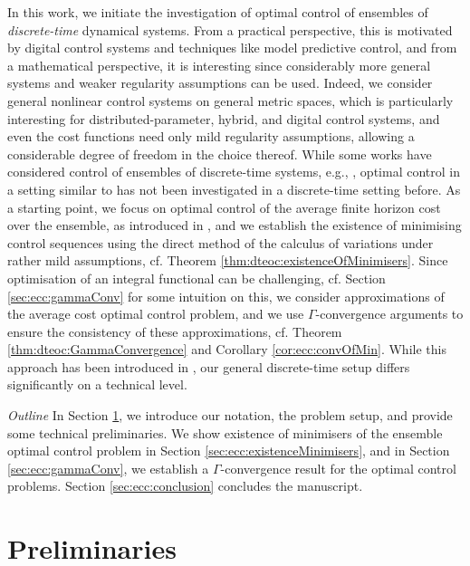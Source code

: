 \documentclass[letterpaper, 10 pt, conference]{IEEEconf}  %
\theoremstyle{theorem}
\theoremstyle{definition}
\theoremstyle{remark}
\begin{document}
In this work, we initiate the investigation of optimal control of ensembles of \emph{discrete-time} dynamical systems.
From a practical perspective, this is motivated by digital control systems and techniques like model predictive control,
and from a mathematical perspective, it is interesting since considerably more general systems and weaker regularity assumptions can be used.
Indeed, we consider general nonlinear control systems on general metric spaces, which is particularly interesting for distributed-parameter, hybrid, and digital control systems, and even the cost functions need only mild regularity assumptions, allowing a considerable degree of freedom in the choice thereof.
While some works have considered control of ensembles of discrete-time systems, e.g., \cite{tie2016controllability}, optimal control in a setting similar to \cite{scagliotti2023optimal} has not been investigated in a discrete-time setting before.
As a starting point, we focus on optimal control of the average finite horizon cost over the ensemble, as introduced in \cite{scagliotti2023optimal},
and we establish the existence of minimising control sequences using the direct method of the calculus of variations under rather mild assumptions, cf. Theorem \ref{thm:dteoc:existenceOfMinimisers}.
Since optimisation of an integral functional can be challenging, cf. Section \ref{sec:ecc:gammaConv} for some intuition on this, we consider approximations of the average cost optimal control problem, and we use $\Gamma$-convergence arguments to ensure the consistency of these approximations, cf. Theorem \ref{thm:dteoc:GammaConvergence} and Corollary \ref{cor:ecc:convOfMin}.
While this approach has been introduced in \cite{scagliotti2023optimal}, our general discrete-time setup differs significantly on a technical level.

\emph{Outline} In Section \ref{sec:ecc:prelims}, we introduce our notation, the problem setup, and provide some technical preliminaries.
We show existence of minimisers of the ensemble optimal control problem in Section \ref{sec:ecc:existenceMinimisers},
and in Section \ref{sec:ecc:gammaConv}, we establish a $\Gamma$-convergence result for the optimal control problems.
Section \ref{sec:ecc:conclusion} concludes the manuscript.
\section{Preliminaries} \label{sec:ecc:prelims}
\end{document}

